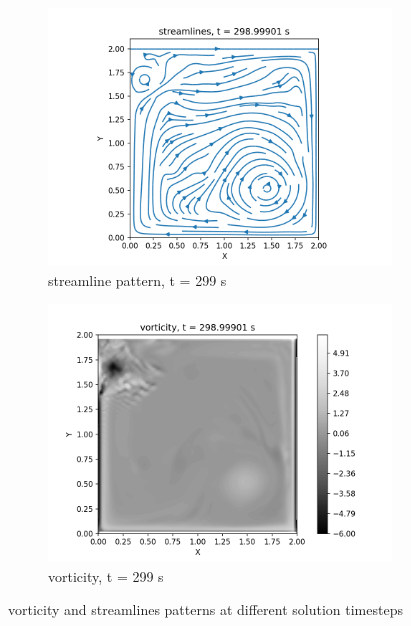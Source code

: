 \begin{figure}
   \continuedfloat
    \begin{subfigure}{0.5\textwidth}
       \centering
        \includegraphics[scale =0.5]{supporting_documents/contours/streamlines/streamlines_0000000299.png}
        \caption{streamline pattern, t = 299 s}
    \end{subfigure}
   \hfill
    \begin{subfigure}{0.5\textwidth}
       \centering
        \includegraphics[scale =0.5]{supporting_documents/contours/vorticity/vorticity_0000000299.png}
        \caption{vorticity, t = 299 s}
    \end{subfigure}
    \caption{vorticity and streamlines patterns at different solution timesteps}
    \label{vorticity_streamlines_contour}
\end{figure}

